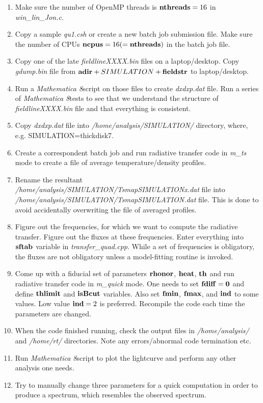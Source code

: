 \documentclass{emulateapj}
\newcommand{\mat}{\textit{Mathematica 8}}
\begin{document}
\begin{enumerate}
\item{Make sure the number of OpenMP threads is ${\bf nthreads}=16$ in \textit{win\_lin\_Jon.c}.}
\item{Copy a sample \textit{qu1.csh} or create a new batch job submission file. Make sure the number of CPUs ${\bf ncpus}=16(={\bf nthreads})$ in the batch job file.}
\item{Copy one of the late \textit{fieldlineXXXX.bin} files on a laptop/desktop. Copy \textit{gdump.bin} file from ${\bf adir}+ SIMULATION +{\bf fieldstr}$ to laptop/desktop.}
\item{Run a \mat script on those files to create \textit{dxdxp.dat} file. Run a series of \mat tests to see that we understand the structure of \textit{fieldlineXXXX.bin} file and
that everything is consistent.}
\item{Copy \textit{dxdxp.dat} file into \textit{/home/analysis/SIMULATION/} directory, where, e.g. SIMULATION=thickdisk7.}
\item{Create a correspondent batch job and run radiative transfer code in \textit{m\_ts} mode to create a file of average temperature/density profiles.}
\item{Rename the resultant \textit{/home/analysis/SIMULATION/TsmapSIMULATIONx.dat} file into \textit{/home/analysis/SIMULATION/TsmapSIMULATION.dat} file. This is done to avoid accidentally
overwriting the file of averaged profiles.}
\item{Figure out the frequencies, for which we want to compute the radiative transfer. Figure out the fluxes at these frequencies. Enter everything into ${\bf sftab}$ variable in
\textit{transfer\_quad.cpp}. While a set of frequencies is obligatory, the fluxes are not obligatory unless a model-fitting routine is invoked.}
\item{Come up with a fiducial set of parameters $\bf rhonor$, $\bf heat$, $\bf th$ and run radiative transfer code in \textit{m\_quick} mode. One needs to set $\bf fdiff=0$ and
define $\bf thlimit$ and $\bf isBcut$ variables. Also set ${\bf fmin}$, ${\bf fmax}$, and ${\bf ind}$ to some values. Low value ${\bf ind}=2$ is preferred.
Recompile the code each time the parameters are changed.}
\item{When the code finished running, check the output files in \textit{/home/analysis/} and \textit{/home/rt/} directories. Note any errors/abnormal code termination etc.}
\item{Run \mat script to plot the lightcurve and perform any other analysis one needs.}
\item{Try to manually change three parameters for a quick computation in order to produce a spectrum, which resembles the observed spectrum.}

\end{enumerate}
\end{document}
